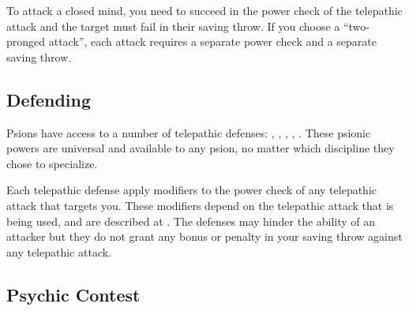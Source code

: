 To attack a closed mind, you need to succeed in the power check of the telepathic attack and the target must fail in their saving throw. If you choose a ``two-pronged attack'', each attack requires a separate power check and a separate saving throw.

\subsection{Defending}
Psions have access to a number of telepathic defenses: , , , , . These psionic powers are universal and available to any psion, no matter which discipline they chose to specialize.

Each telepathic defense apply modifiers to the power check of any telepathic attack that targets you. These modifiers depend on the telepathic attack that is being used, and are described at . The defenses may hinder the ability of an attacker but they do not grant any bonus or penalty in your saving throw against any telepathic attack.


\subsection{Psychic Contest}

